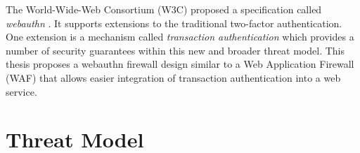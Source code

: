 The World-Wide-Web Consortium (W3C) proposed a specification called \textit{webauthn} \cite{TODO-webauthn}. It supports extensions to the traditional two-factor authentication. One extension is a mechanism called \textit{transaction authentication} which provides a number of security guarantees within this new and broader threat model. This thesis proposes a webauthn firewall design similar to a Web Application Firewall (WAF) that allows easier integration of transaction authentication into a web service.







\section{Threat Model}\label{Sec:ThreatModel}

